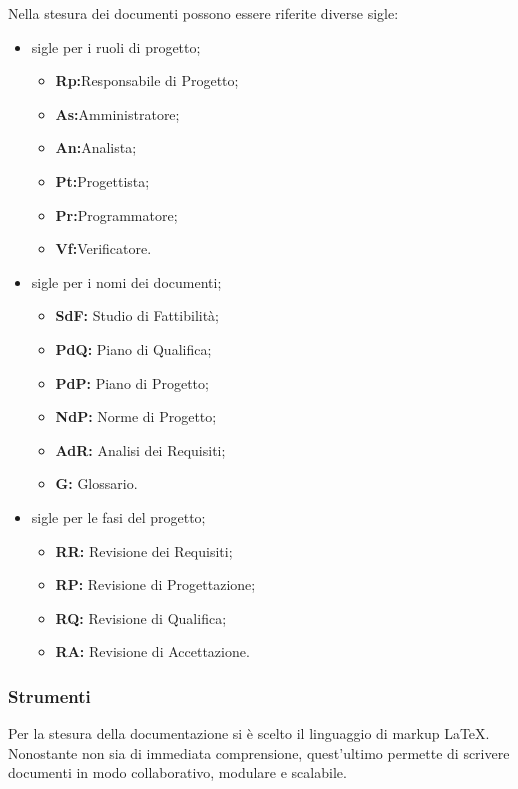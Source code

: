         Nella stesura dei documenti possono essere riferite diverse sigle:
        \begin{itemize}
          \item sigle per i ruoli di progetto;
            \begin{itemize}
              \item \textbf{Rp:}Responsabile di Progetto;
              \item \textbf{As:}Amministratore;
              \item \textbf{An:}Analista;
              \item \textbf{Pt:}Progettista;
              \item \textbf{Pr:}Programmatore;
              \item \textbf{Vf:}Verificatore.
            \end{itemize}
          \item sigle per i nomi dei documenti;
            \begin{itemize}
              \item \textbf{SdF:} Studio di Fattibilità;
              \item \textbf{PdQ:} Piano di Qualifica;
              \item \textbf{PdP:} Piano di Progetto;
              \item \textbf{NdP:} Norme di Progetto;
              \item \textbf{AdR:} Analisi dei Requisiti;
              \item \textbf{G:} Glossario.
            \end{itemize}
          \item sigle per le fasi del progetto;
            \begin{itemize}
              \item \textbf{RR:} Revisione dei Requisiti;
              \item \textbf{RP:} Revisione di Progettazione;
              \item \textbf{RQ:} Revisione di Qualifica;
              \item \textbf{RA:} Revisione di Accettazione.
            \end{itemize}
        \end{itemize}

    \subsubsection{Strumenti}
      \subsubsubsection{\LaTeX}
        Per la stesura della documentazione si è scelto il linguaggio di markup \LaTeX. Nonostante non sia di immediata comprensione, quest'ultimo permette di scrivere documenti in modo collaborativo, modulare e scalabile.

